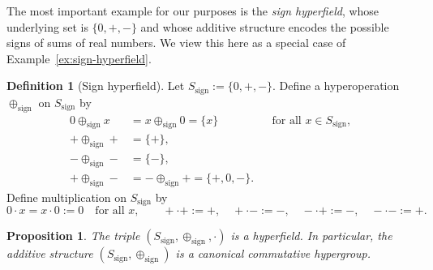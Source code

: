 \documentclass[11pt]{amsart}
\numberwithin{equation}{section}
\newtheorem{proposition}[theorem]{Proposition}
\theoremstyle{definition}
\newtheorem{definition}[theorem]{Definition}
\theoremstyle{remark}
\begin{document}
The most important example for our purposes is the \emph{sign
hyperfield}, whose underlying set is $\{0,+,-\}$ and whose additive
structure encodes the possible signs of sums of real numbers.  We view
this here as a special case of Example~\ref{ex:sign-hyperfield}.

\begin{definition}[Sign hyperfield]\label{def:sign-hyperfield}
Let $S_{\mathrm{sign}}:=\{0,+,-\}$.  Define a hyperoperation
$\oplus_{\mathrm{sign}}$ on $S_{\mathrm{sign}}$ by
\begin{align*}
  0\oplus_{\mathrm{sign}} x
  &= x\oplus_{\mathrm{sign}} 0
   = \{x\}
   &&\text{for all }x\in S_{\mathrm{sign}},\\
  +\oplus_{\mathrm{sign}} +
  &= \{+\},\\
  -\oplus_{\mathrm{sign}} -
  &= \{-\},\\
  +\oplus_{\mathrm{sign}} -
  &= -\oplus_{\mathrm{sign}} +
   = \{+,0,-\}.
\end{align*}
Define multiplication on $S_{\mathrm{sign}}$ by
\[
  0\cdot x = x\cdot 0 := 0\quad\text{for all }x,\qquad
  +\cdot + := +,\quad
  +\cdot - := -,\quad
  -\cdot + := -,\quad
  -\cdot - := +.
\]
\end{definition}

\begin{proposition}\label{prop:sign-hyperfield}
The triple $(S_{\mathrm{sign}},
\oplus_{\mathrm{sign}},\cdot)$ is a hyperfield.  In particular, the
additive structure $(S_{\mathrm{sign}},\oplus_{\mathrm{sign}})$ is a
canonical commutative hypergroup.
\end{proposition}
\end{document}
